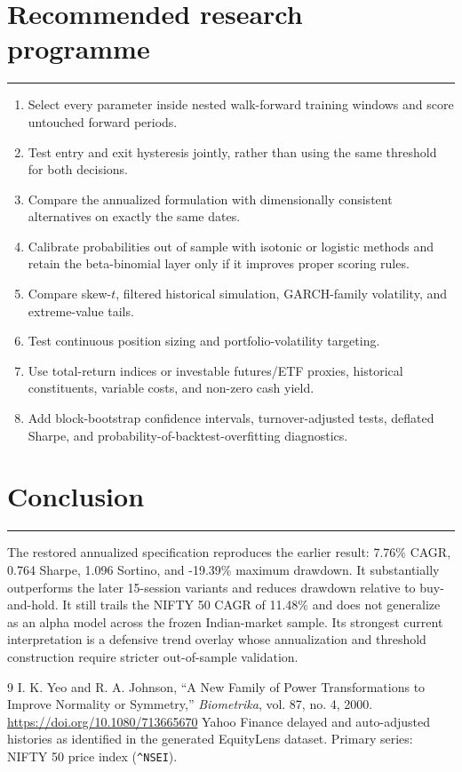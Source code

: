 \documentclass[11pt,a4paper]{article}
\newcommand{\sectionrule}{\vspace{-0.5em}\par\noindent\color{SignalGreen}\rule{\linewidth}{0.7pt}\color{Ink}\par\vspace{0.3em}}
\newcommand{\code}[1]{\texttt{#1}}
\begin{document}
\section{Recommended research programme}
\sectionrule
\begin{enumerate}
\item Select every parameter inside nested walk-forward training windows and score untouched forward periods.
\item Test entry and exit hysteresis jointly, rather than using the same threshold for both decisions.
\item Compare the annualized formulation with dimensionally consistent alternatives on exactly the same dates.
\item Calibrate probabilities out of sample with isotonic or logistic methods and retain the beta-binomial layer only if it improves proper scoring rules.
\item Compare skew-$t$, filtered historical simulation, GARCH-family volatility, and extreme-value tails.
\item Test continuous position sizing and portfolio-volatility targeting.
\item Use total-return indices or investable futures/ETF proxies, historical constituents, variable costs, and non-zero cash yield.
\item Add block-bootstrap confidence intervals, turnover-adjusted tests, deflated Sharpe, and probability-of-backtest-overfitting diagnostics.
\end{enumerate}

\section{Conclusion}
\sectionrule
The restored annualized specification reproduces the earlier result: 7.76\% CAGR, 0.764 Sharpe, 1.096 Sortino, and -19.39\% maximum drawdown. It substantially outperforms the later 15-session variants and reduces drawdown relative to buy-and-hold. It still trails the NIFTY 50 CAGR of 11.48\% and does not generalize as an alpha model across the frozen Indian-market sample. Its strongest current interpretation is a defensive trend overlay whose annualization and threshold construction require stricter out-of-sample validation.

\begin{thebibliography}{9}
I. K. Yeo and R. A. Johnson, ``A New Family of Power Transformations to Improve Normality or Symmetry,'' \emph{Biometrika}, vol. 87, no. 4, 2000. \url{https://doi.org/10.1080/713665670}
Yahoo Finance delayed and auto-adjusted histories as identified in the generated EquityLens dataset. Primary series: NIFTY 50 price index (\code{\^{}NSEI}).
\end{thebibliography}
\end{document}
